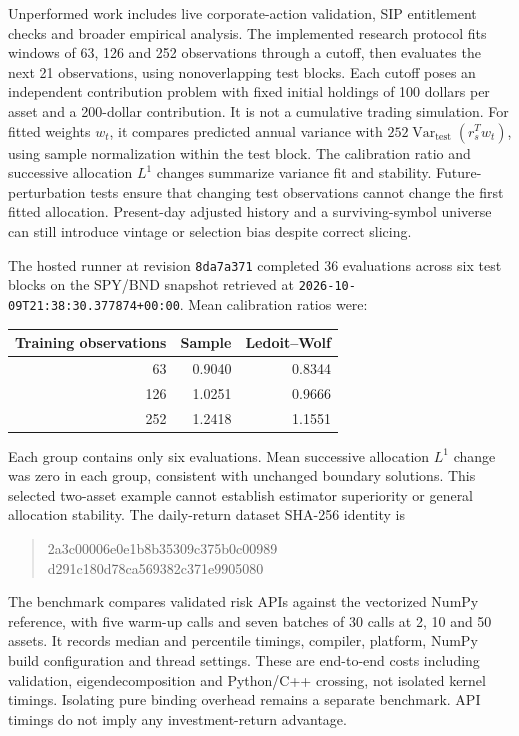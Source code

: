 \documentclass[
  american,
  11pt,
]{article}
\begin{document}
Unperformed work includes live corporate-action validation, SIP entitlement checks
and broader empirical analysis. The implemented
research protocol fits windows of 63, 126 and 252 observations through a cutoff,
then evaluates the next 21 observations, using nonoverlapping test blocks.
Each cutoff poses an independent contribution problem with fixed initial
holdings of 100 dollars per asset and a 200-dollar contribution. It is not
a cumulative trading simulation. For fitted weights \(w_t\), it compares
predicted annual variance with \(252\operatorname{Var}_{\mathrm{test}}(r_s^Tw_t)\),
using sample normalization within the test block. The calibration ratio and
successive allocation \(L^1\) changes summarize variance fit and stability.
Future-perturbation tests ensure that changing test observations cannot change
the first fitted allocation. Present-day adjusted history and a surviving-symbol
universe can still introduce vintage or selection bias despite correct slicing.

The hosted runner at revision \texttt{8da7a371} completed 36 evaluations across
six test blocks on the SPY/BND snapshot retrieved at
\texttt{2026-10-09T21:38:30.377874+00:00}. Mean calibration ratios were:
\begin{center}
\begin{tabular}{rrr}
\toprule
Training observations & Sample & Ledoit--Wolf \\
\midrule
63 & 0.9040 & 0.8344 \\
126 & 1.0251 & 0.9666 \\
252 & 1.2418 & 1.1551 \\
\bottomrule
\end{tabular}
\end{center}
Each group contains only six evaluations. Mean successive allocation
$L^1$ change was zero in each group, consistent with unchanged boundary
solutions. This selected two-asset example cannot establish estimator superiority
or general allocation stability. The daily-return dataset SHA-256 identity is
\begin{quote}\ttfamily\small
2a3c00006e0e1b8b35309c375b0c00989\\
d291c180d78ca569382c371e9905080
\end{quote}

The benchmark compares validated risk APIs against the vectorized NumPy
reference, with five warm-up calls and seven batches of 30 calls at 2, 10
and 50 assets. It records median and percentile timings, compiler, platform,
NumPy build configuration and thread settings. These are end-to-end costs
including validation, eigendecomposition and Python/C++ crossing, not isolated
kernel timings. Isolating pure binding overhead remains a separate benchmark.
API timings do not imply any investment-return advantage.
\end{document}

